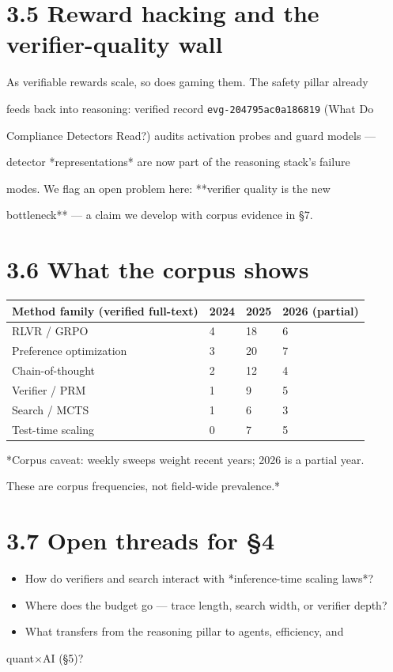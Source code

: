 \documentclass[11pt]{article}
\begin{document}
\section{3.5 Reward hacking and the verifier-quality wall}

As verifiable rewards scale, so does gaming them. The safety pillar already

feeds back into reasoning: verified record \texttt{evg-204795ac0a186819} (What Do

Compliance Detectors Read?) audits activation probes and guard models ---

detector *representations* are now part of the reasoning stack's failure

modes. We flag an open problem here: **verifier quality is the new

bottleneck** --- a claim we develop with corpus evidence in \S7.


\section{3.6 What the corpus shows}

\begin{table}[h]\centering\begin{tabular}{llll}
\hline
Method family (verified full-text) & 2024 & 2025 & 2026 (partial) \\
\hline
RLVR / GRPO & 4 & 18 & 6 \\
Preference optimization & 3 & 20 & 7 \\
Chain-of-thought & 2 & 12 & 4 \\
Verifier / PRM & 1 & 9 & 5 \\
Search / MCTS & 1 & 6 & 3 \\
Test-time scaling & 0 & 7 & 5 \\
\hline\end{tabular}\end{table}


*Corpus caveat: weekly sweeps weight recent years; 2026 is a partial year.

These are corpus frequencies, not field-wide prevalence.*


\section{3.7 Open threads for \S4}

\begin{itemize}
\item How do verifiers and search interact with *inference-time scaling laws*?
\item Where does the budget go --- trace length, search width, or verifier depth?
\item What transfers from the reasoning pillar to agents, efficiency, and
\end{itemize}
quant$\times$AI (\S5)?
\end{document}
